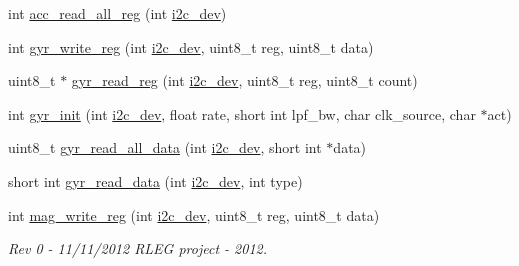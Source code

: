 \begin{DoxyCompactItemize}
int \hyperlink{imu__functions_01_07C_xC3_xB3pia_01em_01conflito_01de_01Andr_xC3_xA9_01Carvalho_012013-04-26_08_8h_a8509cccabb08e7267677f66f25718731}{acc\-\_\-read\-\_\-all\-\_\-reg} (int \hyperlink{CommunicationV0_2communication_8c_a7751bd45ac1064efb35adf1f19c25db8}{i2c\-\_\-dev})
\item 
int \hyperlink{imu__functions_01_07C_xC3_xB3pia_01em_01conflito_01de_01Andr_xC3_xA9_01Carvalho_012013-04-26_08_8h_a3eba167b8ab0614bfe7bafeae8b5570d}{gyr\-\_\-write\-\_\-reg} (int \hyperlink{CommunicationV0_2communication_8c_a7751bd45ac1064efb35adf1f19c25db8}{i2c\-\_\-dev}, uint8\-\_\-t reg, uint8\-\_\-t data)
\item 
uint8\-\_\-t $\ast$ \hyperlink{imu__functions_01_07C_xC3_xB3pia_01em_01conflito_01de_01Andr_xC3_xA9_01Carvalho_012013-04-26_08_8h_ad817a3b69d4c3026b7a9b6de32753e7b}{gyr\-\_\-read\-\_\-reg} (int \hyperlink{CommunicationV0_2communication_8c_a7751bd45ac1064efb35adf1f19c25db8}{i2c\-\_\-dev}, uint8\-\_\-t reg, uint8\-\_\-t count)
\item 
int \hyperlink{imu__functions_01_07C_xC3_xB3pia_01em_01conflito_01de_01Andr_xC3_xA9_01Carvalho_012013-04-26_08_8h_a6d02be352b4491a236c9695a6a24d174}{gyr\-\_\-init} (int \hyperlink{CommunicationV0_2communication_8c_a7751bd45ac1064efb35adf1f19c25db8}{i2c\-\_\-dev}, float rate, short int lpf\-\_\-bw, char clk\-\_\-source, char $\ast$act)
\item 
uint8\-\_\-t \hyperlink{imu__functions_01_07C_xC3_xB3pia_01em_01conflito_01de_01Andr_xC3_xA9_01Carvalho_012013-04-26_08_8h_a710fbc7095ccd58ffa65d2240030a0ab}{gyr\-\_\-read\-\_\-all\-\_\-data} (int \hyperlink{CommunicationV0_2communication_8c_a7751bd45ac1064efb35adf1f19c25db8}{i2c\-\_\-dev}, short int $\ast$data)
\item 
short int \hyperlink{imu__functions_01_07C_xC3_xB3pia_01em_01conflito_01de_01Andr_xC3_xA9_01Carvalho_012013-04-26_08_8h_a271b37e9ace81b18bb2f83787247d262}{gyr\-\_\-read\-\_\-data} (int \hyperlink{CommunicationV0_2communication_8c_a7751bd45ac1064efb35adf1f19c25db8}{i2c\-\_\-dev}, int type)
\item 
int \hyperlink{imu__functions_01_07C_xC3_xB3pia_01em_01conflito_01de_01Andr_xC3_xA9_01Carvalho_012013-04-26_08_8h_ab5d0ae421cd4bb10b1b7a1eda167416b}{mag\-\_\-write\-\_\-reg} (int \hyperlink{CommunicationV0_2communication_8c_a7751bd45ac1064efb35adf1f19c25db8}{i2c\-\_\-dev}, uint8\-\_\-t reg, uint8\-\_\-t data)
\begin{DoxyCompactList}\small\item\em Rev 0 -\/ 11/11/2012 R\-L\-E\-G project -\/ 2012. \end{DoxyCompactList}\item 

\end{DoxyCompactItemize}
